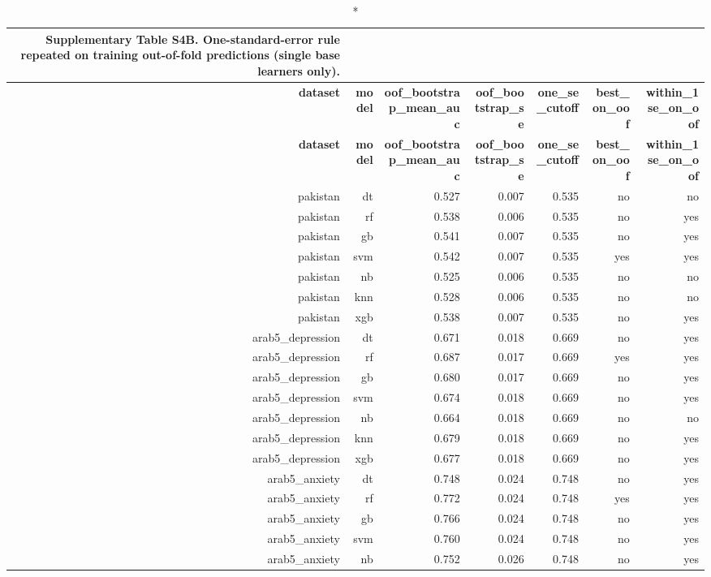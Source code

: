 \documentclass[10pt]{article}
\begin{document}
\tiny
\setlength{\tabcolsep}{2pt}
\begin{longtable}{rrrrrrr}
\caption*{\textbf{Supplementary Table S4B.} One-standard-error rule repeated on training out-of-fold predictions (single base learners only).}\\
\toprule
\textbf{dataset} & \textbf{model} & \textbf{oof\_bootstrap\_mean\_auc} & \textbf{oof\_bootstrap\_se} & \textbf{one\_se\_cutoff} & \textbf{best\_on\_oof} & \textbf{within\_1se\_on\_oof} \\
\midrule
\endfirsthead
\toprule
\textbf{dataset} & \textbf{model} & \textbf{oof\_bootstrap\_mean\_auc} & \textbf{oof\_bootstrap\_se} & \textbf{one\_se\_cutoff} & \textbf{best\_on\_oof} & \textbf{within\_1se\_on\_oof} \\
\midrule
\endhead
\bottomrule
\endfoot
pakistan & dt & 0.527 & 0.007 & 0.535 & no & no \\
pakistan & rf & 0.538 & 0.006 & 0.535 & no & yes \\
pakistan & gb & 0.541 & 0.007 & 0.535 & no & yes \\
pakistan & svm & 0.542 & 0.007 & 0.535 & yes & yes \\
pakistan & nb & 0.525 & 0.006 & 0.535 & no & no \\
pakistan & knn & 0.528 & 0.006 & 0.535 & no & no \\
pakistan & xgb & 0.538 & 0.007 & 0.535 & no & yes \\
arab5\_depression & dt & 0.671 & 0.018 & 0.669 & no & yes \\
arab5\_depression & rf & 0.687 & 0.017 & 0.669 & yes & yes \\
arab5\_depression & gb & 0.680 & 0.017 & 0.669 & no & yes \\
arab5\_depression & svm & 0.674 & 0.018 & 0.669 & no & yes \\
arab5\_depression & nb & 0.664 & 0.018 & 0.669 & no & no \\
arab5\_depression & knn & 0.679 & 0.018 & 0.669 & no & yes \\
arab5\_depression & xgb & 0.677 & 0.018 & 0.669 & no & yes \\
arab5\_anxiety & dt & 0.748 & 0.024 & 0.748 & no & yes \\
arab5\_anxiety & rf & 0.772 & 0.024 & 0.748 & yes & yes \\
arab5\_anxiety & gb & 0.766 & 0.024 & 0.748 & no & yes \\
arab5\_anxiety & svm & 0.760 & 0.024 & 0.748 & no & yes \\
arab5\_anxiety & nb & 0.752 & 0.026 & 0.748 & no & yes \\

\end{longtable}
\end{document}
